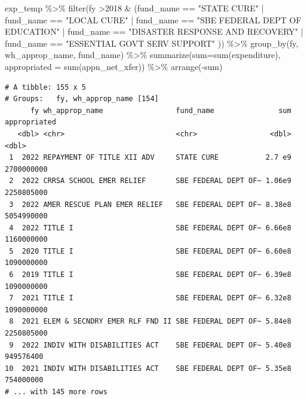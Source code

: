 \documentclass[
  letterpaper,
  DIV=11,
  numbers=noendperiod]{scrreport}
\newenvironment{Shaded}{\begin{snugshade}}{\end{snugshade}}
\newcommand{\AttributeTok}[1]{\textcolor[rgb]{0.40,0.45,0.13}{#1}}
\newcommand{\DecValTok}[1]{\textcolor[rgb]{0.68,0.00,0.00}{#1}}
\newcommand{\FunctionTok}[1]{\textcolor[rgb]{0.28,0.35,0.67}{#1}}
\newcommand{\NormalTok}[1]{\textcolor[rgb]{0.00,0.23,0.31}{#1}}
\newcommand{\SpecialCharTok}[1]{\textcolor[rgb]{0.37,0.37,0.37}{#1}}
\newcommand{\StringTok}[1]{\textcolor[rgb]{0.13,0.47,0.30}{#1}}
\begin{document}
\begin{Shaded}
\begin{Highlighting}[]
\NormalTok{exp\_temp }\SpecialCharTok{\%\textgreater{}\%} \FunctionTok{filter}\NormalTok{(fy }\SpecialCharTok{\textgreater{}}\DecValTok{2018} \SpecialCharTok{\&}\NormalTok{ (fund\_name }\SpecialCharTok{==} \StringTok{"STATE CURE"} \SpecialCharTok{|}\NormalTok{ fund\_name }\SpecialCharTok{==} \StringTok{"LOCAL CURE"} \SpecialCharTok{|}\NormalTok{ fund\_name }\SpecialCharTok{==} \StringTok{"SBE FEDERAL DEPT OF EDUCATION"} \SpecialCharTok{|}\NormalTok{ fund\_name }\SpecialCharTok{==} \StringTok{"DISASTER RESPONSE AND RECOVERY"} \SpecialCharTok{|}\NormalTok{ fund\_name }\SpecialCharTok{==} \StringTok{"ESSENTIAL GOVT SERV SUPPORT"}\NormalTok{ )) }\SpecialCharTok{\%\textgreater{}\%} 
  \FunctionTok{group\_by}\NormalTok{(fy, wh\_approp\_name, fund\_name) }\SpecialCharTok{\%\textgreater{}\%} 
  \FunctionTok{summarize}\NormalTok{(}\AttributeTok{sum=}\FunctionTok{sum}\NormalTok{(expenditure),}
            \AttributeTok{appropriated =} \FunctionTok{sum}\NormalTok{(appn\_net\_xfer)) }\SpecialCharTok{\%\textgreater{}\%} 
  \FunctionTok{arrange}\NormalTok{(}\SpecialCharTok{{-}}\NormalTok{sum)}
\end{Highlighting}
\end{Shaded}

\begin{verbatim}
# A tibble: 155 x 5
# Groups:   fy, wh_approp_name [154]
      fy wh_approp_name                 fund_name               sum appropriated
   <dbl> <chr>                          <chr>                 <dbl>        <dbl>
 1  2022 REPAYMENT OF TITLE XII ADV     STATE CURE           2.7 e9   2700000000
 2  2022 CRRSA SCHOOL EMER RELIEF       SBE FEDERAL DEPT OF~ 1.06e9   2250805000
 3  2022 AMER RESCUE PLAN EMER RELIEF   SBE FEDERAL DEPT OF~ 8.38e8   5054990000
 4  2022 TITLE I                        SBE FEDERAL DEPT OF~ 6.66e8   1160000000
 5  2020 TITLE I                        SBE FEDERAL DEPT OF~ 6.60e8   1090000000
 6  2019 TITLE I                        SBE FEDERAL DEPT OF~ 6.39e8   1090000000
 7  2021 TITLE I                        SBE FEDERAL DEPT OF~ 6.32e8   1090000000
 8  2021 ELEM & SECNDRY EMER RLF FND II SBE FEDERAL DEPT OF~ 5.84e8   2250805000
 9  2022 INDIV WITH DISABILITIES ACT    SBE FEDERAL DEPT OF~ 5.40e8    949576400
10  2021 INDIV WITH DISABILITIES ACT    SBE FEDERAL DEPT OF~ 5.35e8    754000000
# ... with 145 more rows
\end{verbatim}
\end{document}
